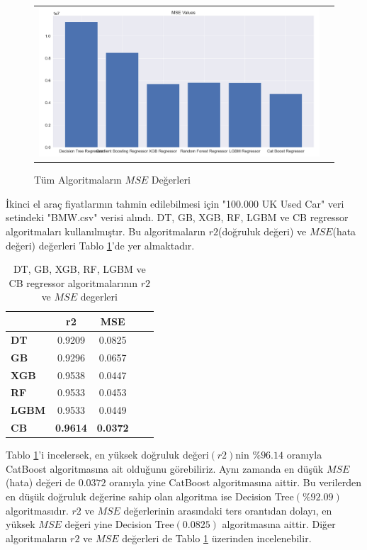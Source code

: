 \documentclass[conference]{IEEEtran}
\begin{document}
\begin{figure}[!h]
	\centering
	\begin{center}
		\begin{tabular}{cc}
			\includegraphics[scale=0.175]{pictures/pic_09.png}&
		\end{tabular}
	\end{center}
	\caption{Tüm Algoritmaların $MSE$ Değerleri}
	\label{fig:09}
\end{figure}

\quad İkinci el araç fiyatlarının tahmin edilebilmesi için "100.000 UK Used Car" \cite{3} veri setindeki "BMW.csv" verisi alındı. DT, GB, XGB, RF, LGBM ve CB regressor algoritmaları kullanılmıştır. Bu algoritmaların $r2$(doğruluk değeri) ve $MSE$(hata değeri) değerleri Tablo \ref{tbl:01}'de yer almaktadır.

\begin{table}[h]
	\centering
	\normalsize
	\begin{tabular}{|l|c|c|c|c|}
		\hline
					& \textbf{r2}	& \textbf{MSE}	\\ \hline
		\textbf{DT}		& 0.9209		& 0.0825		\\ \hline
		\textbf{GB}		& 0.9296		& 0.0657		\\ \hline
		\textbf{XGB}		& 0.9538		& 0.0447		\\ \hline
		\textbf{RF}		& 0.9533		& 0.0453		\\ \hline
		\textbf{LGBM}	& 0.9533		& 0.0449		\\ \hline
		\textbf{CB}		& \textbf{0.9614}	& \textbf{0.0372}	\\ \hline
	\end{tabular}
	\caption{DT, GB, XGB, RF, LGBM ve CB regressor algoritmalarının $r2$ ve $MSE$ degerleri}
	\label{tbl:01}
\end{table}

\quad Tablo \ref{tbl:01}'i incelersek, en yüksek doğruluk değeri$(r2)$nin $\%96.14$ oranıyla CatBoost algoritmasına ait olduğunu görebiliriz. Aynı zamanda en düşük $MSE$(hata) değeri de $0.0372$ oranıyla yine CatBoost algoritmasına aittir. Bu verilerden en düşük doğruluk değerine sahip olan algoritma ise Decision Tree$(\%92.09)$ algoritmasıdır. $r2$ ve $MSE$ değerlerinin arasındaki ters orantıdan dolayı, en yüksek $MSE$ değeri yine Decision Tree$(0.0825)$ algoritmasına aittir. Diğer algoritmaların $r2$ ve $MSE$ değerleri de Tablo \ref{tbl:01} üzerinden incelenebilir.
\end{document}
